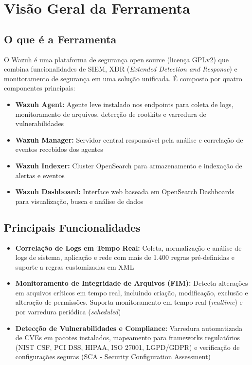 \documentclass[12pt,a4paper]{article}
\begin{document}
    \newpage
    \section{Visão Geral da Ferramenta}

    \subsection{O que é a Ferramenta}

    O Wazuh é uma plataforma de segurança open source (licença GPLv2) que combina funcionalidades de SIEM, XDR (\textit{Extended Detection and Response}) e monitoramento de segurança em uma solução unificada. É composto por quatro componentes principais:

    \begin{itemize}
        \item \textbf{Wazuh Agent:} Agente leve instalado nos endpoints para coleta de logs, monitoramento de arquivos, detecção de rootkits e varredura de vulnerabilidades
        \item \textbf{Wazuh Manager:} Servidor central responsável pela análise e correlação de eventos recebidos dos agentes
        \item \textbf{Wazuh Indexer:} Cluster OpenSearch para armazenamento e indexação de alertas e eventos
        \item \textbf{Wazuh Dashboard:} Interface web baseada em OpenSearch Dashboards para visualização, busca e análise de dados
    \end{itemize}

    \subsection{Principais Funcionalidades}

    \begin{itemize}
        \item \textbf{Correlação de Logs em Tempo Real:} Coleta, normalização e análise de logs de sistema, aplicação e rede com mais de 1.400 regras pré-definidas e suporte a regras customizadas em XML
        \item \textbf{Monitoramento de Integridade de Arquivos (FIM):} Detecta alterações em arquivos críticos em tempo real, incluindo criação, modificação, exclusão e alteração de permissões. Suporta monitoramento em tempo real (\textit{realtime}) e por varredura periódica (\textit{scheduled})
        \item \textbf{Detecção de Vulnerabilidades e Compliance:} Varredura automatizada de CVEs em pacotes instalados, mapeamento para frameworks regulatórios (NIST CSF, PCI DSS, HIPAA, ISO 27001, LGPD/GDPR) e verificação de configurações seguras (SCA - Security Configuration Assessment)
    \end{itemize}
\end{document}
